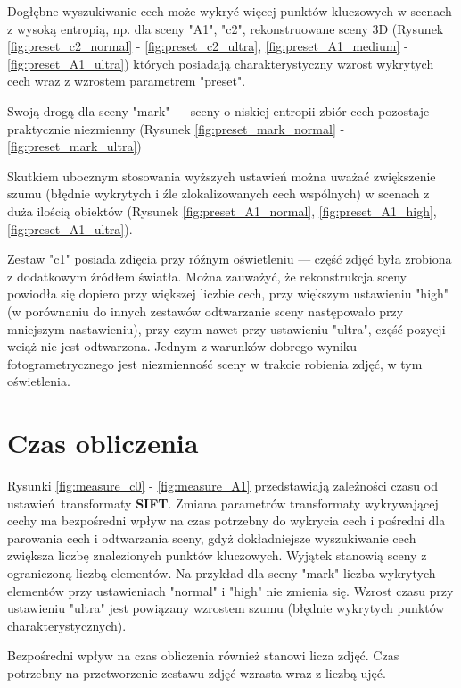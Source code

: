 Dogłębne wyszukiwanie cech może wykryć więcej punktów kluczowych w scenach z wysoką entropią, np. dla sceny "A1", "c2", rekonstruowane sceny 3D (Rysunek \ref{fig:preset_c2_normal} - \ref{fig:preset_c2_ultra}, \ref{fig:preset_A1_medium} -  \ref{fig:preset_A1_ultra}) których posiadają charakterystyczny wzrost wykrytych cech wraz z wzrostem parametrem "preset".


Swoją drogą dla sceny "mark" --- sceny o niskiej entropii zbiór cech pozostaje praktycznie niezmienny (Rysunek \ref{fig:preset_mark_normal} - \ref{fig:preset_mark_ultra})


Skutkiem ubocznym stosowania wyższych ustawień można uważać zwiększenie szumu (błędnie wykrytych i źle zlokalizowanych cech wspólnych) w scenach z duża ilością obiektów (Rysunek \ref{fig:preset_A1_normal}, \ref{fig:preset_A1_high}, \ref{fig:preset_A1_ultra}).

Zestaw "c1" posiada zdięcia przy róźnym oświetleniu --- część zdjęć była zrobiona z dodatkowym źródłem światła.
Można zauważyć, że rekonstrukcja sceny powiodła się dopiero przy większej liczbie cech, przy większym ustawieniu "high" (w porównaniu do innych zestawów odtwarzanie sceny następowało przy mniejszym nastawieniu), przy czym nawet przy ustawieniu "ultra", część pozycji wciąż nie jest odtwarzona.
Jednym z warunków dobrego wyniku fotogrametrycznego jest niezmienność sceny w trakcie robienia zdjęć, w tym oświetlenia.

\section{Czas obliczenia}

Rysunki \ref{fig:measure_c0} - \ref{fig:measure_A1} przedstawiają zależności czasu od ustawień transformaty \textbf{SIFT}.
Zmiana parametrów transformaty wykrywającej cechy ma bezpośredni wpływ na czas potrzebny do wykrycia cech i pośredni dla parowania cech i odtwarzania sceny, gdyż dokładniejsze wyszukiwanie cech zwiększa liczbę znalezionych punktów kluczowych.
Wyjątek stanowią sceny z ograniczoną liczbą elementów.
Na przykład dla sceny "mark" liczba wykrytych elementów przy ustawieniach "normal" i "high" nie zmienia się. Wzrost czasu przy ustawieniu "ultra" jest powiązany wzrostem szumu (błędnie wykrytych punktów charakterystycznych).

Bezpośredni wpływ na czas obliczenia również stanowi licza zdjęć.
Czas potrzebny na przetworzenie zestawu zdjęć wzrasta wraz z liczbą ujęć.

